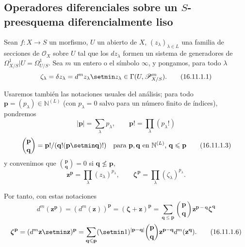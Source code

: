 \subsection{Operadores diferenciales sobre un $S$-preesquema diferencialmente
liso}
\label{IV.16.11}

\begin{env}[16.11.1]
\label{IV.16.11.1}
Sean $f:X\to S$ un morfismo, $U$ un abierto de $X$,
$(z_\lambda)_{\lambda\in L}$ una familia de secciones de $\mathcal{O}_X$
sobre $U$ tal que los $dz_\lambda$ formen un sistema de generadores
de $\varOmega_{X/S}^1|U=\varOmega_{U/S}^1$. Sea $m$ un entero o el símbolo
$\infty$, y pongamos, para todo $\lambda$
\[
  \zeta_\lambda=\delta z_\lambda=d^m z_\lambda\setmin z_\lambda
  \in\Gamma(U,\mathscr{P}_{X/S}^m).
  \tag{16.11.1.1}
  \label{IV.16.11.1.1}
\]

Usaremos también las notaciones usuales del análisis; para todo
$\mathbf{p}=(p_\lambda)\in\mathbb{N}^{(L)}$ (con $p_\lambda=0$ salvo para un
número finito de índices), pondremos
\[
  |\mathbf{p}|=\sum_\lambda p_\lambda,
  \qquad \mathbf{p}!=\prod_\lambda(p_\lambda!)
  \tag{16.11.1.2}
  \label{IV.16.11.1.2}
\]
\[
  \binom{\mathbf{p}}{\mathbf{q}}
  =\mathbf{p}!/(\mathbf{q}!(\mathbf p\setmin\mathbf{q})!)
  \quad\text{para $\mathbf{p},\mathbf{q}$ en $\mathbb{N}^{(L)}$,
  $\mathbf{q}\leq\mathbf{p}$}
  \tag{16.11.1.3}
  \label{IV.16.11.1.3}
\]
y convenimos que $\binom{\mathbf{p}}{\mathbf{q}}=0$ si
$\mathbf{q}\nleq\mathbf{p}$,
\[
  \mathbf{z}^{\mathbf{p}}=\prod_\lambda(z_\lambda)^{p_\lambda},
  \qquad
  \boldsymbol{\zeta}^{\mathbf{p}}=\prod_\lambda(\zeta_\lambda)^{p_\lambda}.
  \tag{16.11.1.4}
  \label{IV.16.11.1.4}
\]

Por tanto, con estas notaciones
\[
  d^m(\mathbf{z}^{\mathbf{p}})
  =(d^m(\mathbf{z}))^{\mathbf{p}}
  =(\boldsymbol{\zeta}+\mathbf{z})^{\mathbf{p}}
  =\sum_{\mathbf{q}\leq\mathbf{p}}
    \binom{\mathbf{p}}{\mathbf{q}}
    \mathbf{z}^{\mathbf{p}-\mathbf{q}}\boldsymbol{\zeta}^{\mathbf{q}}
  \tag{16.11.1.5}
  \label{IV.16.11.1.5}
\]
\[
  \boldsymbol{\zeta}^{\mathbf{p}}
  =(d^m\mathbf z\setmin\mathbf{z})^{\mathbf{p}}
  =\sum_{\mathbf{q}\leq\mathbf{p}}
    (\setmin 1)^{|\mathbf{p}-\mathbf{q}|}
    \binom{\mathbf{p}}{\mathbf{q}}
    \mathbf{z}^{\mathbf{p}-\mathbf{q}}d^m(\mathbf{z}^{\mathbf{q}}).
  \tag{16.11.1.6}
  \label{IV.16.11.1.6}
\]


\end{env}
